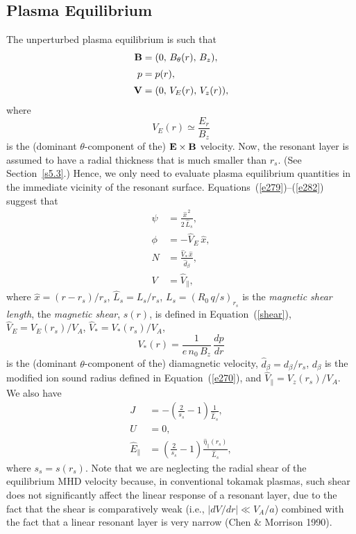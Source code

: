 \documentclass[notitlepage,12pt]{article}
\begin{document}
\subsection{Plasma Equilibrium}
The unperturbed plasma equilibrium is such that
\begin{align}
{\bf B} &= (0,\,B_\theta(r),\,B_z),\\[0.5ex]
p &= p(r),\\[0.5ex]
{\bf V} &= (0,\,V_E(r),\,V_z(r)),\label{e282}
\end{align}
where 
\begin{equation}
V_E(r)\simeq \frac{E_r}{B_z}
\end{equation}
 is the (dominant $\theta$-component of the) ${\bf E}\times {\bf B}$ velocity. Now, the resonant layer is assumed to have a radial thickness that is
much smaller than $r_s$. (See Section~\ref{s5.3}.) Hence, we only need to evaluate plasma equilibrium quantities in the immediate vicinity of the resonant
surface. Equations~(\ref{e279})--(\ref{e282}) suggest that 
\begin{align}\label{e287}
\psi &= \frac{\hat{x}^{\,2}}{2\,\hat{L}_s},\\[0.5ex]
\phi &= - \hat{V}_E\,\hat{x},\\[0.5ex]
N &= \frac{\hat{V}_\ast\,\hat{x}}{\hat{d}_\beta},\\[0.5ex]
V &= \hat{V}_\parallel,\label{e290}
\end{align}
where $\hat{x}=(r-r_s)/r_s$, $\hat{L}_s=L_s/r_s$, $L_s=(R_0\,q/s)_{r_s}$ is the {\em magnetic shear length},  the {\em magnetic shear}, $s(r)$, is defined in Equation~(\ref{shear}), $\hat{V}_E= V_E(r_s)/V_A$,
$\hat{V}_\ast= V_\ast(r_s)/V_A$,
\begin{equation}
V_\ast(r) = \frac{1}{e\,n_0\,B_z}\,\frac{dp}{dr}
\end{equation}
is the (dominant $\theta$-component of the) diamagnetic velocity, $\hat{d}_\beta=d_\beta/r_s$, $d_\beta$ is the modified  ion sound radius defined in 
Equation~(\ref{e270}), and 
 $\hat{V}_\parallel= V_z(r_s)/V_A$. We also have
 \begin{align}\label{e292}
 J &= -\left(\frac{2}{s_s}-1\right)\frac{1}{\hat{L}_s},\\[0.5ex]
 U &= 0,\label{e293}\\[0.5ex]
 \hat{E}_\parallel &=\left(\frac{2}{s_s}-1\right) \frac{\hat{\eta}_\parallel(r_s)}{\hat{L}_s},\label{e294}
\end{align}
where $s_s=s(r_s)$. 
Note that we are neglecting the radial shear of the equilibrium MHD velocity because, in conventional tokamak plasmas, such shear does not significantly affect the linear response of a  resonant
layer, due to the fact that the shear is comparatively weak (i.e., $|dV/dr|\ll V_A/a$) combined with the fact that a linear  resonant layer is
very narrow (Chen \& Morrison 1990). 
\end{document}
